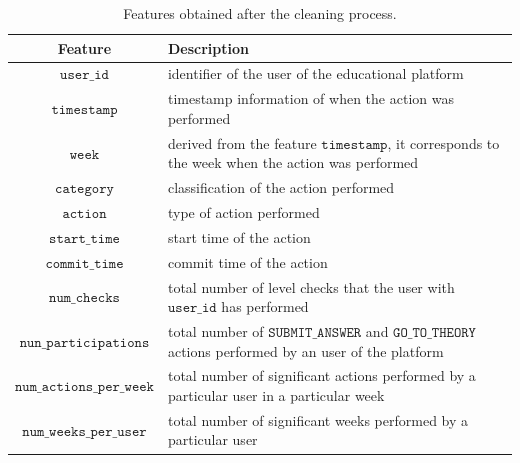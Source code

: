 \documentclass[sigplan,screen]{acmart}
\begin{document}
\begin{table}[h]
  \caption{Features obtained after the cleaning process.}
  \label{tab:features}
  \begin{tabular}{cl}
    \toprule
    \textbf{Feature}&\textbf{Description}\\
    \midrule
    $\texttt{user\_id}$ & identifier of the user of the educational platform \\
    $\texttt{timestamp}$ & timestamp information of when the action was performed \\
    $\texttt{week}$ & derived from the feature $\texttt{timestamp}$, it corresponds to the week when the action was performed \\
    $\texttt{category}$ & classification of the action performed \\
    $\texttt{action}$ & type of action performed \\
    $\texttt{start\_time}$ & start time of the action \\
    $\texttt{commit\_time}$ & commit time of the action \\
    $\texttt{num\_checks}$ & total number of level checks that the user with $\texttt{user\_id}$ has performed \\
    $\texttt{nun\_participations}$ & total number of $\texttt{SUBMIT\_ANSWER}$ and $\texttt{GO\_TO\_THEORY}$ actions performed by an user of the platform \\
    $\texttt{num\_actions\_per\_week}$ & total number of significant actions performed by a particular user in a particular week \\
    $\texttt{num\_weeks\_per\_user}$ & total number of significant weeks performed by a particular user \\
    \bottomrule
    \end{tabular}
\end{table}
\end{document}
